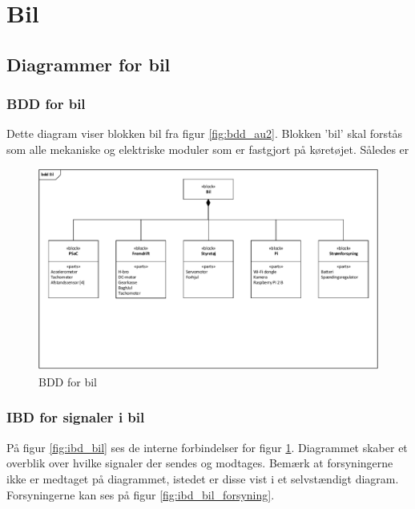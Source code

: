 \section{Bil}

\subsection{Diagrammer for bil}

\subsubsection{BDD for bil} %

Dette diagram viser blokken bil fra figur \ref{fig:bdd_au2}. Blokken 'bil' skal forstås som alle mekaniske og elektriske moduler som er fastgjort på køretøjet. Således er 

\begin{figure}[h]
\centering
\includegraphics[width=\textwidth]{../fig/diagrammer/bil/bdd_bil.pdf}
\caption{BDD for bil}
\label{fig:bdd_bil}
\end{figure}
\clearpage

\subsubsection{IBD for signaler i bil}

På figur \ref{fig:ibd_bil} ses de interne forbindelser for figur \ref{fig:bdd_bil}. Diagrammet skaber et overblik over hvilke signaler der sendes og modtages. Bemærk at forsyningerne ikke er medtaget på diagrammet, istedet er disse vist i et selvstændigt diagram. Forsyningerne kan ses på figur \ref{fig:ibd_bil_forsyning}.

